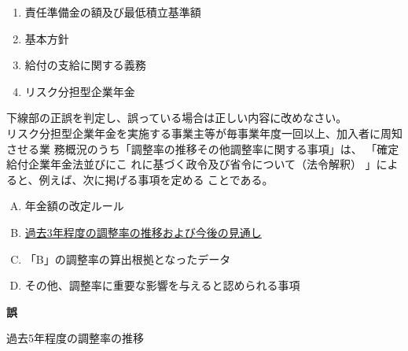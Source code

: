 \begin{answerbox}
  \begin{enumerate}[A: ]
    \item 責任準備金の額及び最低積立基準額
    \item 基本方針
    \item 給付の支給に関する義務
    \item リスク分担型企業年金
  \end{enumerate}
\end{answerbox}

\begin{truefalse}[年金1 2019 問題1(2)\textcircled{2}]
  下線部の正誤を判定し、誤っている場合は正しい内容に改めなさい。
\\

  リスク分担型企業年金を実施する事業主等が毎事業年度一回以上、加入者に周知させる業
務概況のうち「調整率の推移その他調整率に関する事項」は、 「確定給付企業年金法並びにこ
れに基づく政令及び省令について（法令解釈） 」によると、例えば、次に掲げる事項を定める
ことである。
\begin{enumerate}[A. ]
  \item 年金額の改定ルール
  \item \underline{過去3年程度の調整率の推移および今後の見通し}
  \item 「B」の調整率の算出根拠となったデータ
  \item その他、調整率に重要な影響を与えると認められる事項
\end{enumerate}
\end{truefalse}

\begin{answerbox}
  \textbf{誤}

  過去5年程度の調整率の推移
\end{answerbox}

\newpage